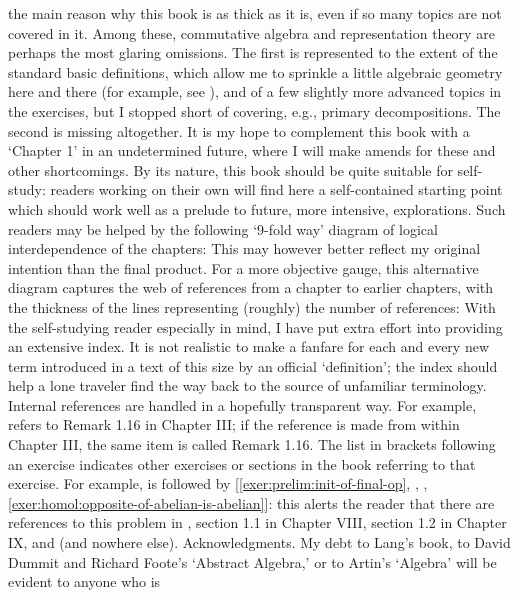 the main reason why this book is as thick as it is, even if so many
topics are not covered in it. Among these, commutative algebra and
representation theory are perhaps the most glaring omissions. The
first is represented to the extent of the standard basic definitions,
which allow me to sprinkle a little algebraic geometry here and there
(for example, see
),
and of a few slightly more advanced topics in the exercises, but I
stopped short of covering, e.g., primary decompositions. The second is
missing altogether.  It is my hope to complement this book with a
`Chapter 1' in an undetermined future, where I will make amends for
these and other shortcomings.  By its nature, this book should be
quite suitable for self-study: readers working on their own will find
here a self-contained starting point which should work well as a
prelude to future, more intensive, explorations. Such readers may be
helped by the following `9-fold way' diagram of logical
interdependence of the chapters: This may however better reflect my
original intention than the final product.  For a more objective
gauge, this alternative diagram captures the web of references from a
chapter to earlier chapters, with the thickness of the lines
representing (roughly) the number of references: With the
self-studying reader especially in mind, I have put extra effort into
providing an extensive index. It is not realistic to make a fanfare
for each and every new term introduced in a text of this size by an
official `definition'; the index should help a lone traveler find the
way back to the source of unfamiliar terminology.  Internal references
are handled in a hopefully transparent way. For example,
 refers to Remark 1.16 in Chapter III; if
the reference is made from within Chapter III, the same item is called
Remark 1.16. The list in brackets following an exercise indicates
other exercises or sections in the book referring to that
exercise. For example,  is followed by
[\ref{exer:prelim:init-of-final-op}, ,
,
\ref{exer:homol:opposite-of-abelian-is-abelian}]: this alerts the
reader that there are references to this problem in
, section 1.1 in Chapter VIII,
section 1.2 in Chapter IX, and
 (and nowhere else).
Acknowledgments. My
debt to Lang's book, to David Dummit and Richard Foote's `Abstract
Algebra,' or to Artin's `Algebra' will be evident to anyone who is
